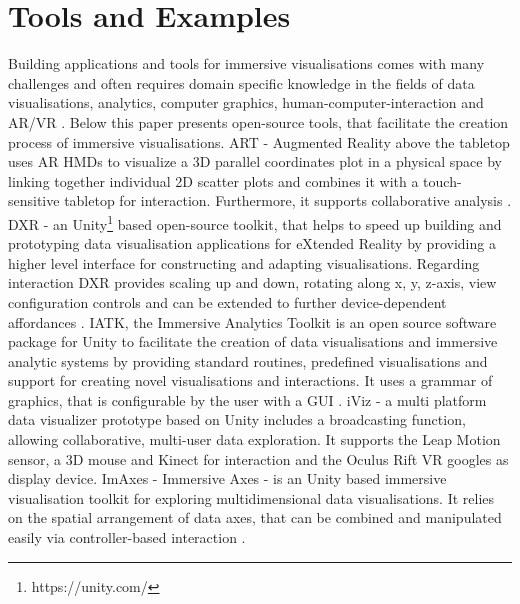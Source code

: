 \section{Tools and Examples}
\label{section:Tools} 
Building applications and tools for immersive visualisations comes with many challenges and often requires domain specific knowledge in the fields of data visualisations, analytics, computer graphics, human-computer-interaction and \ac{AR}/\ac{VR} \autocite[1]{Sicat2019}. Below this paper presents open-source tools, that facilitate the creation process of immersive visualisations.\newline
ART - Augmented Reality above the tabletop uses \ac{AR} \ac{HMD}s to visualize a 3D parallel coordinates plot in a physical space by linking together individual 2D scatter plots and combines it with a touch-sensitive tabletop for interaction. Furthermore, it supports collaborative analysis \autocite[]{Butscher2018}. \newline
DXR - an Unity\footnote{https://unity.com/} based open-source toolkit, that helps to speed up building and prototyping data visualisation applications for eXtended Reality by providing  a higher level interface for constructing and adapting visualisations. Regarding interaction DXR provides scaling up and down, rotating along x, y, z-axis, view configuration controls and can be extended to further device-dependent affordances \autocite[2]{Sicat2019}.\newline
IATK, the Immersive Analytics Toolkit is an open source software package for Unity to facilitate the creation of data visualisations and immersive analytic systems by providing standard routines, predefined visualisations and support for creating novel visualisations and interactions. It uses a grammar of graphics, that is configurable by the user with a GUI \autocite[]{Cordeil2019}.\newline
iViz - a multi platform data visualizer prototype based on Unity includes a broadcasting function, allowing collaborative, multi-user data exploration. It supports the Leap Motion sensor, a 3D mouse and Kinect for interaction and the Oculus Rift \ac{VR} googles as display device. \autocite[]{Donalek2015}\newline
ImAxes - Immersive Axes - is an Unity based immersive visualisation toolkit for exploring multidimensional data visualisations. It relies on the spatial arrangement of data axes, that can be combined and manipulated easily via controller-based interaction \autocite[]{Cordeil2017a}. \newline
